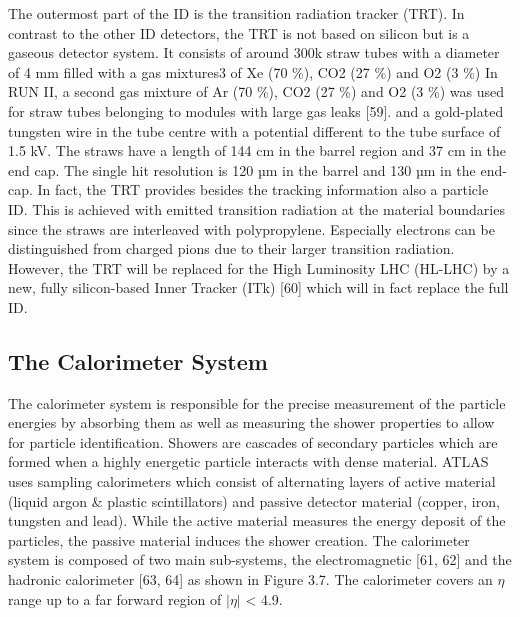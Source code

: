 The outermost part of the ID is the transition radiation tracker (TRT). In contrast to the other ID detectors, the TRT is not based on silicon but is a gaseous detector system. It consists of around 300k straw tubes with a diameter of 4 mm filled with a gas mixtures3 of Xe (70 \%), CO2 (27 \%) and O2 (3 \%) In RUN II, a second gas mixture of Ar (70 \%), CO2 (27 \%) and O2 (3 \%) was used for straw tubes belonging to modules with large gas leaks [59].
 and a gold-plated tungsten wire in the tube centre with a potential different to the tube surface of 1.5 kV. The straws have a length of 144 cm in the barrel region and 37 cm in the end cap. The single hit resolution is 120 µm in the barrel and 130 µm in the end-cap. In fact, the TRT provides besides the tracking information also a particle ID. This is achieved with emitted transition radiation at the material boundaries since the straws are interleaved with polypropylene. Especially electrons can be distinguished from charged pions due to their larger transition radiation. However, the TRT will be replaced for the High Luminosity LHC (HL-LHC) by a new, fully silicon-based Inner Tracker (ITk) [60] which will in fact replace the full ID.


\subsection{The Calorimeter System}

The calorimeter system is responsible for the precise measurement of the particle energies by absorbing them as well as measuring the shower properties to allow for particle identification. Showers
are cascades of secondary particles which are formed when a highly energetic particle interacts with
dense material. ATLAS uses sampling calorimeters which consist of alternating layers of active material (liquid argon \& plastic scintillators) and passive detector material (copper, iron, tungsten and
lead). While the active material measures the energy deposit of the particles, the passive material
induces the shower creation. The calorimeter system is composed of two main sub-systems, the electromagnetic [61, 62] and the hadronic calorimeter [63, 64] as shown in Figure 3.7. The calorimeter
covers an $\eta$ range up to a far forward region of $|\eta|$ < 4.9.


